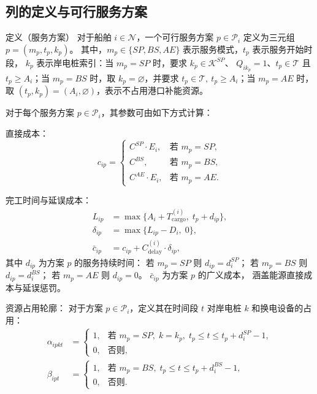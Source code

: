 \documentclass[UTF8, a4paper, 12pt]{ctexart}
\theoremstyle{plain}
\theoremstyle{definition}
\theoremstyle{remark}
\begin{document}
\subsection{列的定义与可行服务方案}
\label{sec:cg_column}

\noindent 定义（服务方案） 对于船舶 $i \in \mathcal{N}$，一个可行服务方案
$p \in \mathcal{P}_i$ 定义为三元组 $p=(m_p,t_p,k_p)$。
其中，$m_p \in \{SP, BS, AE\}$ 表示服务模式，$t_p$ 表示服务开始时段，
$k_p$ 表示岸电桩索引：当 $m_p=SP$ 时，要求 $k_p \in \mathcal{K}^{SP}$、
$Q_{ik_p}=1$、$t_p \in \mathcal{T}$ 且 $t_p \ge A_i$；当 $m_p=BS$ 时，取
$k_p=\varnothing$，并要求 $t_p \in \mathcal{T},\ t_p \ge A_i$；当 $m_p=AE$
时，取 $(t_p,k_p)=(A_i,\varnothing)$，表示不占用港口补能资源。

\noindent
对于每个服务方案 $p \in \mathcal{P}_i$，其参数可由如下方式计算：

\medskip
\noindent 直接成本：
\begin{equation}
  c_{ip} =
  \begin{cases}
    C^{SP} \cdot E_i, & \text{若 } m_p = SP, \\
    C^{BS}, & \text{若 } m_p = BS, \\
    C^{AE} \cdot E_i, & \text{若 } m_p = AE.
  \end{cases}
  \label{eq:col_cost}
\end{equation}

\noindent 完工时间与延误成本：
\begin{align}
  L_{ip} &= \max\!\Big\{A_i + T_{\text{cargo}}^{(i)},\;
    t_p + d_{ip}\Big\},
  \label{eq:col_finish} \\
  \delta_{ip} &= \max\!\big\{L_{ip} - D_i,\; 0\big\},
  \label{eq:col_delay} \\
  \bar{c}_{ip} &= c_{ip} + C_{\text{delay}}^{(i)} \cdot \delta_{ip},
  \label{eq:col_gencost}
\end{align}
其中 $d_{ip}$ 为方案 $p$ 的服务持续时间：
若 $m_p = SP$ 则 $d_{ip} = d_i^{SP}$；
若 $m_p = BS$ 则 $d_{ip} = d_i^{BS}$；
若 $m_p = AE$ 则 $d_{ip} = 0$。
$\bar{c}_{ip}$ 为方案 $p$ 的广义成本，
涵盖能源直接成本与延误惩罚。

\medskip
\noindent 资源占用轮廓：
对于方案 $p \in \mathcal{P}_i$，定义其在时间段 $t$ 对岸电桩 $k$ 和换电设备的占用：
\begin{align}
  \alpha_{ipkt} &=
  \begin{cases}
    1, & \text{若 } m_p = SP,\; k = k_p,\;
         t_p \le t \le t_p + d_i^{SP} - 1, \\
    0, & \text{否则},
  \end{cases}
  \label{eq:col_alpha} \\
  \beta_{ipt} &=
  \begin{cases}
    1, & \text{若 } m_p = BS,\;
         t_p \le t \le t_p + d_i^{BS} - 1, \\
    0, & \text{否则}.
  \end{cases}
  \label{eq:col_beta}
\end{align}
\end{document}

